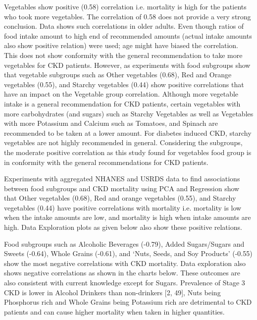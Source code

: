 \noindent Vegetables show positive (0.58) correlation i.e. mortality is high for the patients who took more vegetables. The correlation of 0.58 does not provide a very strong conclusion. Data shows such correlations in older adults. Even though ratios of food intake amount to high end of recommended amounts (actual intake amounts also show positive relation) were used; age might have biased the correlation. This does not show conformity with the general recommendation to take more vegetables for CKD patients. However, as experiments with food subgroups show that vegetable subgroups such as Other vegetables (0.68), Red and Orange vegetables (0.55), and Starchy vegetables (0.44) show positive correlations that have an impact on the Vegetable group correlation.  Although more vegetable intake is a general recommendation for CKD patients, certain vegetables with more carbohydrates (and sugars) such as Starchy Vegetables as well as Vegetables with more Potassium and Calcium such as Tomatoes, and Spinach are recommended to be taken at a lower amount. For diabetes induced CKD, starchy vegetables are not highly recommended in general. Considering the subgroups, the moderate positive correlation as this study found for vegetables food group is in conformity with the general recommendations for CKD patients.

\noindent Experiments with aggregated NHANES and USRDS data to find associations between food subgroups and CKD mortality using PCA and Regression show that  Other vegetables (0.68),    Red and orange vegetables (0.55), and Starchy vegetables (0.44)  have positive correlations with mortality i.e. mortality is low when the intake amounts are low, and mortality is high when intake amounts are high. Data Exploration plots as given below also show these positive relations.

\noindent  Food subgroups such as Alcoholic Beverages (-0.79),    Added Sugars/Sugars and Sweets (-0.64), Whole Grains (-0.61), and  `Nuts, Seeds, and Soy Products' (-0.55) show the most negative correlations with CKD mortality. Data exploration also shows negative correlations as shown in the charts below. These outcomes are also consistent with current knowledge except for Sugars. Prevalence of Stage 3 CKD is lower in Alcohol Drinkers than non-drinkers [2, 49], Nuts being Phosphorus rich and Whole Grains being Potassium rich are detrimental to CKD patients and can cause higher mortality when taken in higher quantities.

